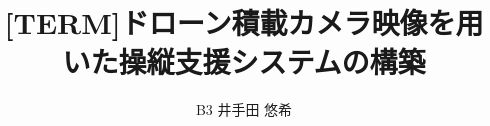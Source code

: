 \documentclass[uplatex,a4j,10pt]{jsarticle}
\begin{document}

\title{[TERM]ドローン積載カメラ映像を用いた操縦支援システムの構築}

\author{
  B3 {井手田 悠希}
}

 

\maketitle
\thispagestyle{empty}







\end{document}
